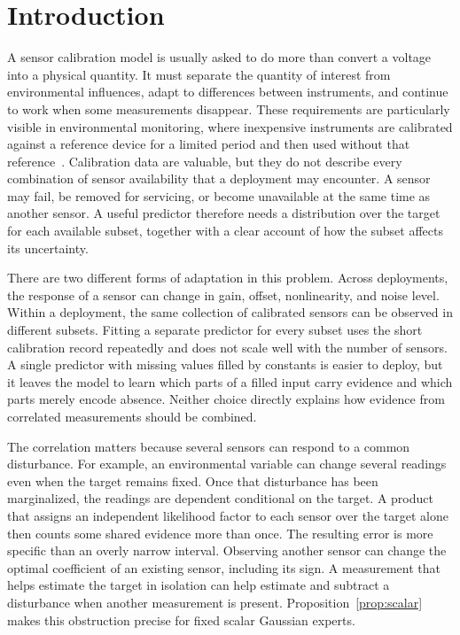 \section{Introduction}
\label{sec:introduction}

A sensor calibration model is usually asked to do more than convert a voltage into a physical quantity. It must separate the quantity of interest from environmental influences, adapt to differences between instruments, and continue to work when some measurements disappear. These requirements are particularly visible in environmental monitoring, where inexpensive instruments are calibrated against a reference device for a limited period and then used without that reference~\citep{zimmerman2018calibration,devito2008airquality}. Calibration data are valuable, but they do not describe every combination of sensor availability that a deployment may encounter. A sensor may fail, be removed for servicing, or become unavailable at the same time as another sensor. A useful predictor therefore needs a distribution over the target for each available subset, together with a clear account of how the subset affects its uncertainty.

There are two different forms of adaptation in this problem. Across deployments, the response of a sensor can change in gain, offset, nonlinearity, and noise level. Within a deployment, the same collection of calibrated sensors can be observed in different subsets. Fitting a separate predictor for every subset uses the short calibration record repeatedly and does not scale well with the number of sensors. A single predictor with missing values filled by constants is easier to deploy, but it leaves the model to learn which parts of a filled input carry evidence and which parts merely encode absence. Neither choice directly explains how evidence from correlated measurements should be combined.

The correlation matters because several sensors can respond to a common disturbance. For example, an environmental variable can change several readings even when the target remains fixed. Once that disturbance has been marginalized, the readings are dependent conditional on the target. A product that assigns an independent likelihood factor to each sensor over the target alone then counts some shared evidence more than once. The resulting error is more specific than an overly narrow interval. Observing another sensor can change the optimal coefficient of an existing sensor, including its sign. A measurement that helps estimate the target in isolation can help estimate and subtract a disturbance when another measurement is present. Proposition~\ref{prop:scalar} makes this obstruction precise for fixed scalar Gaussian experts.

